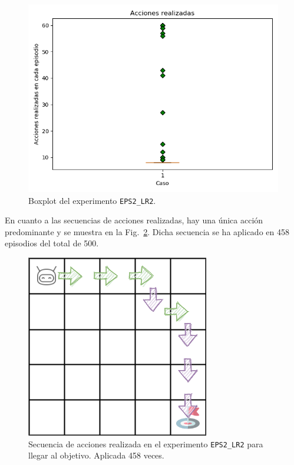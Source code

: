 \begin{figure}
    \centering
    \includegraphics[scale=0.4]{cap5_experimentacion/images/dim5_lr0.01_ep0.2_boxplot.png}
    \caption{Boxplot del experimento \texttt{EPS2\_LR2}.}
    \label{fig:dim5_lr0.01_ep0.2_boxplot}
\end{figure}

En cuanto a las secuencias de acciones realizadas, hay una única acción predominante y se muestra en la Fig.~\ref{fig:dim5_lr0.01_ep0.2_458}. Dicha secuencia se ha aplicado en 458 episodios del total de 500.  \\

\begin{figure}
    \centering
    \includegraphics[scale=0.4]{cap5_experimentacion/images/dim5_lr0.01_ep0.2_458.png}
    \caption{Secuencia de acciones realizada en el experimento \texttt{EPS2\_LR2} para llegar al objetivo. Aplicada 458 veces.}
    \label{fig:dim5_lr0.01_ep0.2_458}
\end{figure}


